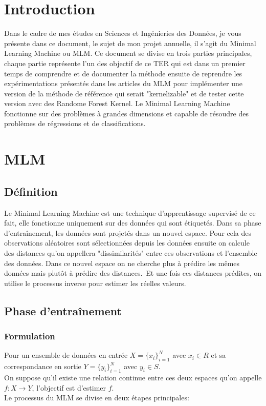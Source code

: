 \documentclass[12pt,a4paper]{report}
\begin{document}
\chapter{Introduction}
\par Dans le cadre de mes études en Sciences et Ingénieries des Données, je vous présente dans ce document, le sujet de mon projet annuelle, il s'agit du Minimal Learning Machine ou MLM. Ce document se divise en trois parties principales, chaque partie représente l'un des objectif de ce TER qui est dans un premier temps de comprendre et de documenter la méthode ensuite de reprendre les expérimentations présentés dans les articles du MLM pour implémenter une version de la méthode de référence qui serait "kernelizable" et de tester cette version avec des Randome Forest Kernel. Le Minimal Learning Machine fonctionne sur des problèmes à grandes dimensions et capable de résoudre des problèmes de régressions et de classifications.

\chapter{MLM}
\section{Définition}
\par Le Minimal Learning Machine est une technique d'apprentissage supervisé de ce fait, elle fonctionne uniquement sur des données qui sont étiquetés. Dans sa phase d'entraînement, les données sont projetés dans un nouvel espace.
Pour cela des observations aléatoires sont sélectionnées depuis les données ensuite on calcule des distances qu'on appellera "dissimilarités" entre ces observations et l'ensemble des données. Dans ce nouvel espace on ne cherche plus à prédire les mêmes données mais plutôt à prédire des distances.\ 
Et une fois ces distances prédites, on utilise le processus inverse pour estimer les réelles valeurs.\
 
\section{Phase d'entraînement }
\subsection{Formulation}
\par Pour un ensemble de données en entrée $X = \{x_i\}_{i=1}^{N}$ avec
$x_i \in R$ et sa correspondance en sortie $Y = \{y_i\}_{i=1}^{N}$ avec $y_i \in S$.\\
On suppose qu'il existe une relation continue entre ces deux espaces qu'on appelle $f: X \rightarrow Y$, l'objectif est d'estimer $f$.\\
Le processus du MLM se divise en deux étapes principales:
\end{document}
